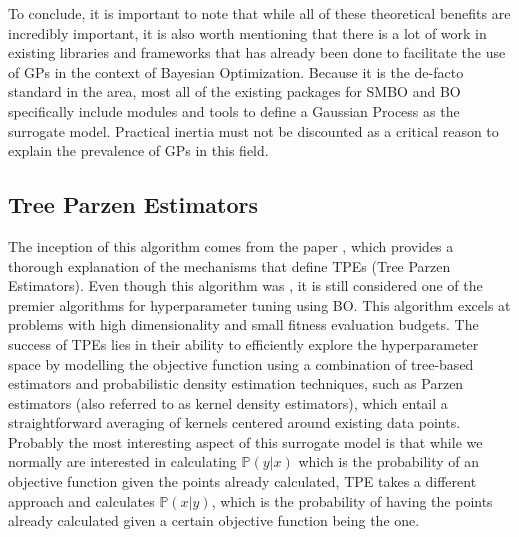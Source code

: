 
To conclude, it is important to note that while all of these theoretical benefits are incredibly important, it is also worth mentioning that there is a lot of work in existing libraries and frameworks that has already been done to facilitate the use of GPs in the context of Bayesian Optimization. Because it is the de-facto standard in the area, most all of the existing packages for SMBO and BO specifically include modules and tools to define a Gaussian Process as the surrogate model. Practical inertia must not be discounted as a critical reason to explain the prevalence of GPs in this field. 

\subsection{Tree Parzen Estimators}

The inception of this algorithm comes from the paper \cite{bergstra2011algorithms}, which provides a thorough explanation of the mechanisms that define TPEs (Tree Parzen Estimators). Even though this algorithm was , it is still considered one of the premier algorithms for hyperparameter tuning using BO. This algorithm excels at problems with high dimensionality and small fitness evaluation budgets. The success of TPEs lies in their ability to efficiently explore the hyperparameter space by modelling the objective function using a combination of tree-based estimators and probabilistic density estimation techniques, such as Parzen estimators (also referred to as kernel density estimators), which entail a straightforward averaging of kernels centered around existing data points. Probably the most interesting aspect of this surrogate model is that while we normally are interested in calculating $\mathbb{P}(y | x)$ which is the probability of an objective function given the points already calculated, TPE takes a different approach and calculates $\mathbb{P}(x | y)$, which is the probability of having the points already calculated given a certain objective function being the  one. 

